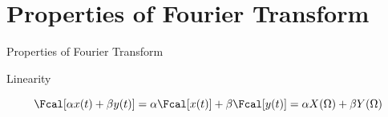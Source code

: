 \documentclass[aspectratio=169,xcolor=dvipsnames,svgnames,x11names,fleqn]{beamer}
\begin{document}




   
    






\section{Properties of Fourier Transform}


\begin{frame}{}
    \begin{center}
    \Huge \bf \color{DarkBlue}
    \faTachometer
    
   Properties of Fourier Transform

\end{center}
\end{frame}

\begin{frame}{Linearity}

    \begin{center}
    \begin{gradgreen}
        $$
        \Fcal[ \alpha x(t) + \beta y(t)] = \alpha \Fcal[x(t)] + \beta\Fcal[y(t)] = \alpha X(\Omega) + \beta Y(\Omega)
        $$
    \end{gradgreen}
    \end{center}
\end{frame}
\end{document}
